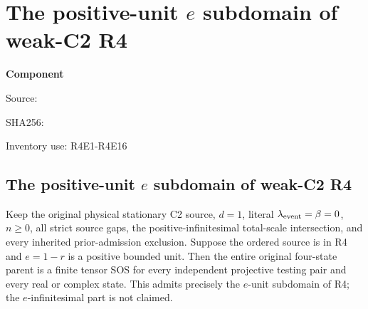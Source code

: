 \chapter{The positive-unit $e$ subdomain of weak-C2 R4}
\label{component:p78dfeedee062}
\noindent\textbf{Component }\par
{\small\noindent Source: \par}
{\small\noindent SHA256: \par}
{\small\noindent Inventory use: R4E1-R4E16\par}
\medskip
\section{The positive-unit $e$ subdomain of weak-C2 R4}
\label{p78dfeedee062:sec:r17-r4-eunit}

\begin{theorem}
Keep the original physical stationary C2 source, $d=1$, literal
$\lambda_{\rm event}=\beta=0$, $n\ge0$, all strict source gaps, the
positive-infinitesimal total-scale intersection, and every inherited
prior-admission exclusion. Suppose the ordered source is in R4 and
$e=1-r$ is a positive bounded unit. Then the entire original four-state
parent is a finite tensor SOS for every independent projective testing
pair and every real or complex state. This admits precisely the
$e$-unit subdomain of R4; the $e$-infinitesimal part is not claimed.
\end{theorem}


